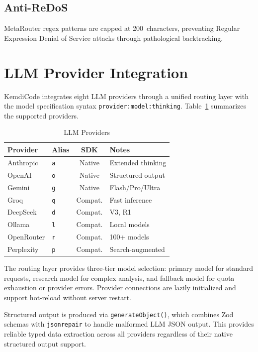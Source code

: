 \documentclass[journal,10pt]{IEEEtran}
\newcommand{\code}[1]{\texttt{#1}}
\begin{document}
\subsection{Anti-ReDoS}

MetaRouter regex patterns are capped at 200~characters, preventing Regular Expression Denial of Service attacks through pathological backtracking.

\section{LLM Provider Integration}
\label{sec:providers}

KemdiCode integrates eight LLM providers through a unified routing layer with the model specification syntax \code{provider:model:thinking}. Table~\ref{tab:providers} summarizes the supported providers.

\begin{table}[!t]
\centering
\caption{LLM Providers}
\label{tab:providers}
\begin{tabular}{@{}llcl@{}}
\toprule
\textbf{Provider} & \textbf{Alias} & \textbf{SDK} & \textbf{Notes} \\
\midrule
Anthropic   & \code{a} & Native  & Extended thinking \\
OpenAI      & \code{o} & Native  & Structured output \\
Gemini      & \code{g} & Native  & Flash/Pro/Ultra \\
Groq        & \code{q} & Compat. & Fast inference \\
DeepSeek    & \code{d} & Compat. & V3, R1 \\
Ollama      & \code{l} & Compat. & Local models \\
OpenRouter  & \code{r} & Compat. & 100+ models \\
Perplexity  & \code{p} & Compat. & Search-augmented \\
\bottomrule
\end{tabular}
\end{table}

The routing layer provides three-tier model selection: primary model for standard requests, research model for complex analysis, and fallback model for quota exhaustion or provider errors. Provider connections are lazily initialized and support hot-reload without server restart.

Structured output is produced via \code{generateObject()}, which combines Zod schemas with \code{jsonrepair} to handle malformed LLM JSON output. This provides reliable typed data extraction across all providers regardless of their native structured output support.
\end{document}
